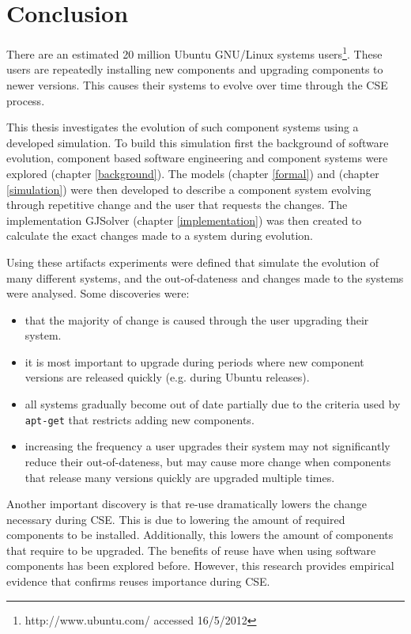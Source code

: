 \chapter{Conclusion}
\label{conclusion}
There are an estimated 20 million Ubuntu GNU/Linux systems users\footnote{http://www.ubuntu.com/ accessed 16/5/2012}.
These users are repeatedly installing new components and upgrading components to newer versions.
This causes their systems to evolve over time through the CSE process.

This thesis investigates the evolution of such component systems using a developed simulation.
To build this simulation first the background of software evolution, component based software engineering and component systems were explored (chapter \ref{background}).
The models \modelname (chapter \ref{formal}) and \usermodel (chapter \ref{simulation}) were then developed 
to describe a component system evolving through repetitive change and the user that requests the changes.
The implementation GJSolver (chapter \ref{implementation}) was then created to calculate the exact changes made to a system during evolution.

Using these artifacts experiments were defined that simulate the evolution of many different systems,
and the out-of-dateness and changes made to the systems were analysed.
Some discoveries were:
\begin{itemize}
  \item that the majority of change is caused through the user upgrading their system.
  \item it is most important to upgrade during periods where new component versions are released quickly (e.g. during Ubuntu releases).
  \item all systems gradually become out of date partially due to the criteria used by \texttt{apt-get} that restricts adding new components.
  \item increasing the frequency a user upgrades their system may not significantly reduce their out-of-dateness, 
  but may cause more change when components that release many versions quickly are upgraded multiple times.
\end{itemize} 

Another important discovery is that re-use dramatically lowers the change necessary during CSE.
This is due to lowering the amount of required components to be installed.
Additionally, this lowers the amount of components that require to be upgraded.
The benefits of reuse have when using software components has been explored before\citep{Szyperski2002}.
However, this research provides empirical evidence that confirms reuses importance during CSE.

